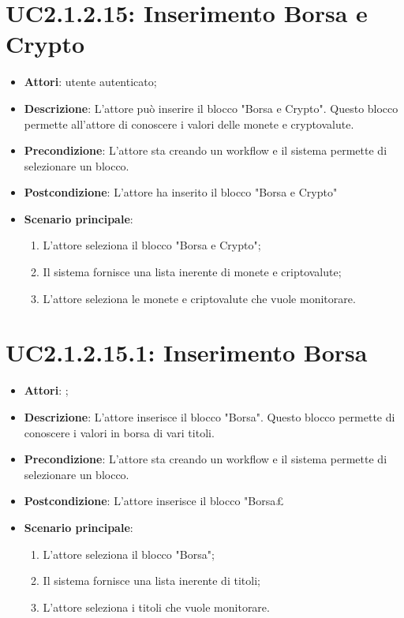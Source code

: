 \section{UC2.1.2.15: Inserimento Borsa e Crypto}
\label{UC2.1.2.15}
\begin{itemize}
	\item \textbf{Attori}: utente autenticato;
	\item \textbf{Descrizione}: L'attore può inserire il blocco "Borsa e Crypto". Questo blocco permette all'attore di conoscere i valori delle monete e cryptovalute. 
	\item \textbf{Precondizione}: L'attore sta creando un workflow e il sistema permette di selezionare un blocco.
	\item \textbf{Postcondizione}: L'attore ha inserito il blocco "Borsa e Crypto"
	\item \textbf{Scenario principale}:
	\begin{enumerate} \item L'attore seleziona il blocco "Borsa e Crypto";  \item  Il sistema fornisce una lista inerente di monete e criptovalute;  \item  L'attore seleziona le monete e criptovalute che vuole monitorare.\end{enumerate}
\end{itemize}




\section{UC2.1.2.15.1: Inserimento Borsa}
\label{UC2.1.2.15.1}
\begin{itemize}
	\item \textbf{Attori}: ;
	\item \textbf{Descrizione}: L'attore inserisce il blocco "Borsa". Questo blocco permette di conoscere i valori in borsa di vari titoli. 
	\item \textbf{Precondizione}: L'attore sta creando un workflow e il sistema permette di selezionare un blocco.
	\item \textbf{Postcondizione}: L'attore inserisce il blocco "Borsa£
	\item \textbf{Scenario principale}:
	\begin{enumerate} \item L'attore seleziona il blocco "Borsa";  \item  Il sistema fornisce una lista inerente di titoli;  \item  L'attore seleziona i titoli che vuole monitorare.\end{enumerate}
\end{itemize}

